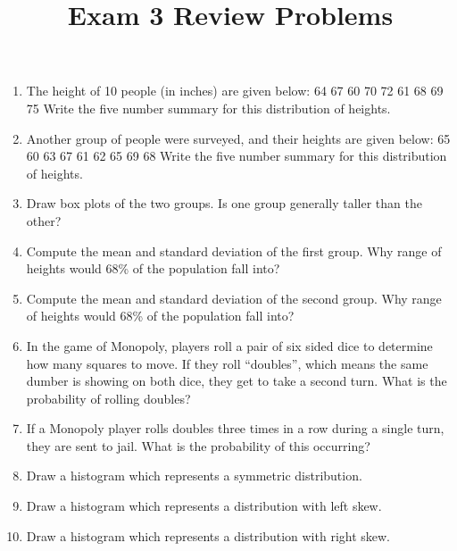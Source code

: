\documentclass{article}
\title{Exam 3 Review Problems}
\begin{document}
\maketitle
\begin{enumerate}
\item The height of 10 people (in inches) are given below:
     64 67 60 70 72 61 68 69 75
    \newline Write the five number summary for this distribution of
        heights.
\item Another group of people were surveyed, and their heights are
    given below:
     65 60 63 67 61 62 65 69 68
    \newline Write the five number summary for this distribution of
    heights.

\item Draw box plots of the two groups.  Is one group generally taller
    than the other?

\item Compute the mean and standard deviation of the first group.  Why
    range of heights would 68\% of the population fall into?  

\item Compute the mean and standard deviation of the second group.  Why
    range of heights would 68\% of the population fall into?  

\item In the game of Monopoly, players roll a pair of six sided dice
    to determine how many squares to move.  If they roll ``doubles'',
    which means the same dumber is showing on both dice, they get to
    take a second turn.  What is the probability of rolling doubles?

\item If a Monopoly player rolls doubles three times in a row during
    a single turn, they are sent to jail.  What is the probability of this
    occurring?

\item Draw a histogram which represents a symmetric distribution.

\item Draw a histogram which represents a distribution with left skew.

\item Draw a histogram which represents a distribution with right skew.

\end{enumerate}
\end{document}
